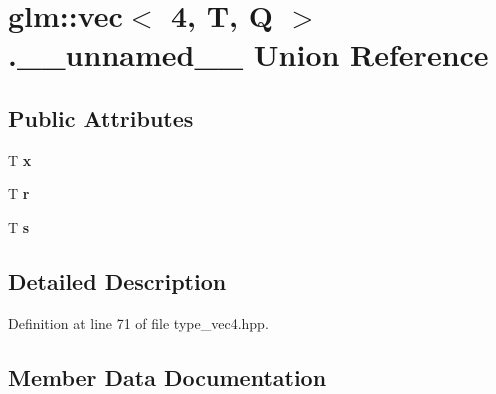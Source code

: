 \hypertarget{unionglm_1_1vec_3_014_00_01T_00_01Q_01_4_8____unnamed____}{}\section{glm\+:\+:vec$<$ 4, T, Q $>$.\+\_\+\+\_\+unnamed\+\_\+\+\_\+ Union Reference}
\label{unionglm_1_1vec_3_014_00_01T_00_01Q_01_4_8____unnamed____}
\subsection*{Public Attributes}
\begin{DoxyCompactItemize}
\item 
\mbox{\label{unionglm_1_1vec_3_014_00_01T_00_01Q_01_4_8____unnamed_____a9dd4e461268c8034f5c8564e155c67a6}} 
T {\bfseries x}
\item 
\mbox{\label{unionglm_1_1vec_3_014_00_01T_00_01Q_01_4_8____unnamed_____a4b43b0aee35624cd95b910189b3dc231}} 
T {\bfseries r}
\item 
\mbox{\label{unionglm_1_1vec_3_014_00_01T_00_01Q_01_4_8____unnamed_____a03c7c0ace395d80182db07ae2c30f034}} 
T {\bfseries s}
\end{DoxyCompactItemize}


\subsection{Detailed Description}


Definition at line 71 of file type\+\_\+vec4.\+hpp.



\subsection{Member Data Documentation}
\mbox{\label{unionglm_1_1vec_3_014_00_01T_00_01Q_01_4_8____unnamed_____a4b43b0aee35624cd95b910189b3dc231}} 
